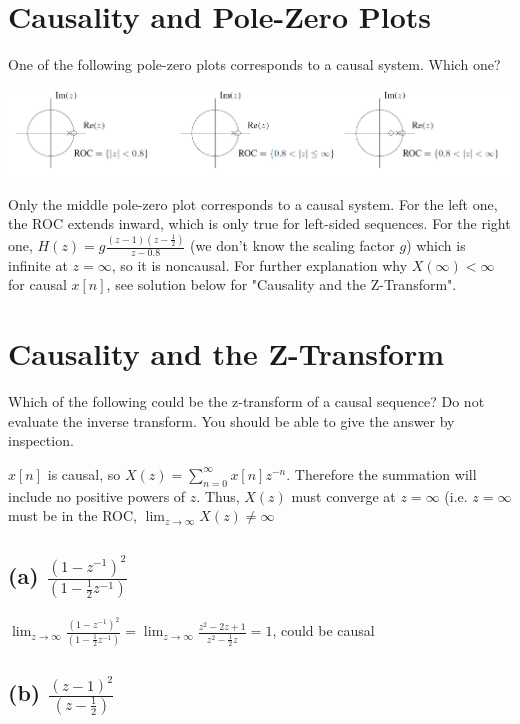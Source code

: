 \documentclass[11pt]{article}
\begin{document}
\section{Causality and Pole-Zero Plots}
One of the following pole-zero plots corresponds to a causal system. Which one?

\includegraphics[width=\textwidth]{causal_pole_zero_plots.png} 

{ \color{blue}
Only the middle pole-zero plot corresponds to a causal system. For the left one, the ROC extends inward, which is only true for left-sided sequences. For the right one, $H(z) = g \frac{(z-1)(z-\frac{1}{2})}{z-0.8}$ (we don't know the scaling factor $g$) which is infinite at $z=\infty$, so it is noncausal. For further explanation why $X(\infty)<\infty$ for causal $x[n]$, see solution below for "Causality and the Z-Transform".

}

\section{Causality and the Z-Transform}
Which of the following could be the z-transform of a causal sequence? Do not evaluate the inverse transform. You should be able to give the answer by inspection.

{\color{blue}
$x[n]$ is causal, so $X(z)=\sum\limits_{n=0}^\infty x[n] z^{-n}$. Therefore the summation will include no positive powers of $z$. Thus, $X(z)$ must converge at $z=\infty$ (i.e. $z=\infty$ must be in the ROC, $\lim_{z\rightarrow \infty} X(z) \neq \infty$
}

\subsection*{(a) $\frac{(1-z^{-1})^2}{(1-\frac{1}{2}z^{-1})}$}

{\color{blue}
$\lim_{z\rightarrow \infty} \frac{(1-z^{-1})^2}{(1-\frac{1}{2}z^{-1})} = \lim_{z\rightarrow \infty} \frac{z^2-2z+1}{z^2-\frac{1}{2}z} = 1$, could be causal
}

\subsection*{(b) $\frac{(z-1)^2}{(z-\frac{1}{2})}$}
\end{document}
